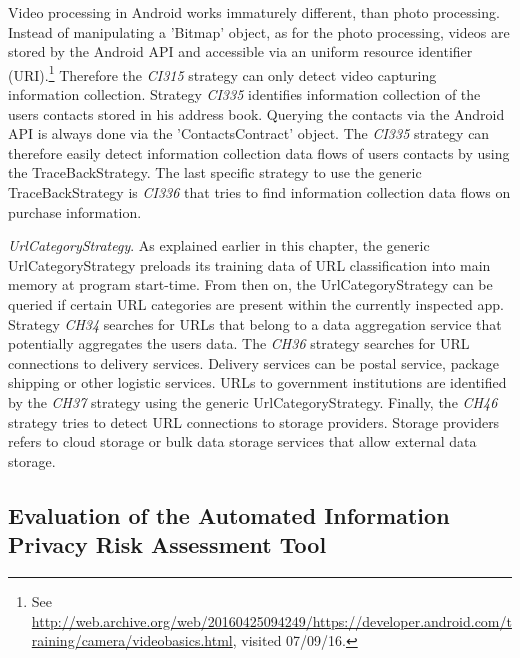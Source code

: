 Video processing in Android works immaturely different, than photo processing.
Instead of manipulating a 'Bitmap' object, as for the photo processing, videos are stored by the Android API and accessible via an uniform resource identifier (\acs{URI}).\footnote{\raggedright See \url{http://web.archive.org/web/20160425094249/https://developer.android.com/training/camera/videobasics.html}, visited 07/09/16.}
Therefore the \textit{CI315} strategy can only detect video capturing information collection.
Strategy \textit{CI335} identifies information collection of the users contacts stored in his address book.
Querying the contacts via the Android API is always done via the 'ContactsContract' object.
The \textit{CI335} strategy can therefore easily detect information collection data flows of users contacts by using the TraceBackStrategy.
The last specific strategy to use the generic TraceBackStrategy is \textit{CI336} that tries to find information collection data flows on purchase information.

\textit{UrlCategoryStrategy}.
As explained earlier in this chapter, the generic UrlCategoryStrategy preloads its training data of \acs{URL} classification into main memory at program start-time.
From then on, the UrlCategoryStrategy can be queried if certain URL categories are present within the currently inspected app. 
Strategy \textit{CH34} searches for URLs that belong to a data aggregation service that potentially aggregates the users data.
The \textit{CH36} strategy searches for URL connections to delivery services.
Delivery services can be postal service, package shipping or other logistic services.
URLs to government institutions are identified by the \textit{CH37} strategy using the generic UrlCategoryStrategy.
Finally, the \textit{CH46} strategy tries to detect URL connections to storage providers.
Storage providers refers to cloud storage or bulk data storage services that allow external data storage.

\subsection{Evaluation of the Automated Information Privacy Risk Assessment Tool}\label{chapter:evaluationMethods}

